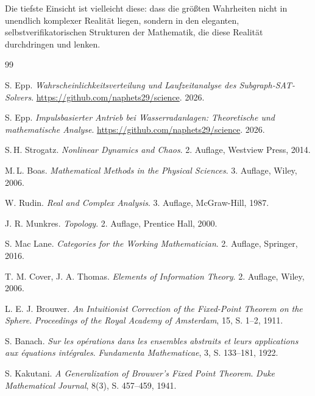 \documentclass[a4paper,12pt]{article}
\theoremstyle{definition}
\begin{document}
Die tiefste Einsicht ist vielleicht diese: dass die größten Wahrheiten nicht in unendlich komplexer Realität liegen, sondern in den eleganten, selbstverifikatorischen Strukturen der Mathematik, die diese Realität durchdringen und lenken.


\begin{thebibliography}{99}


 S. Epp. \textit{Wahrscheinlichkeitsverteilung und Laufzeitanalyse des Subgraph-SAT-Solvers}. \url{https://github.com/naphets29/science}. 2026.

 S. Epp. \textit{Impulsbasierter Antrieb bei Wasserradanlagen: Theoretische und mathematische Analyse}. \url{https://github.com/naphets29/science}. 2026.


 S.\,H. Strogatz. \textit{Nonlinear Dynamics and Chaos}. 2. Auflage, Westview Press, 2014.

 M.\,L. Boas. \textit{Mathematical Methods in the Physical Sciences}. 3. Auflage, Wiley, 2006.

 W. Rudin. \textit{Real and Complex Analysis}. 3. Auflage, McGraw-Hill, 1987.

 J. R. Munkres. \textit{Topology}. 2. Auflage, Prentice Hall, 2000.

 S. Mac Lane. \textit{Categories for the Working Mathematician}. 2. Auflage, Springer, 2016.

 T. M. Cover, J. A. Thomas. \textit{Elements of Information Theory}. 2. Auflage, Wiley, 2006.


 L. E. J. Brouwer. \textit{An Intuitionist Correction of the Fixed-Point Theorem on the Sphere}. \textit{Proceedings of the Royal Academy of Amsterdam}, 15, S. 1--2, 1911.

 S. Banach. \textit{Sur les opérations dans les ensembles abstraits et leurs applications aux équations intégrales}. \textit{Fundamenta Mathematicae}, 3, S. 133--181, 1922.

 S. Kakutani. \textit{A Generalization of Brouwer's Fixed Point Theorem}. \textit{Duke Mathematical Journal}, 8(3), S. 457--459, 1941.


\end{thebibliography}
\end{document}
